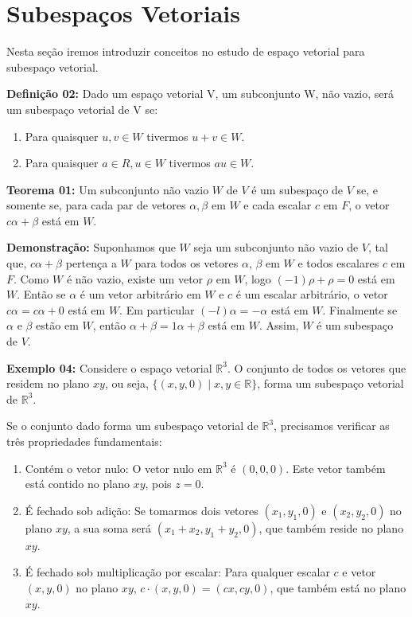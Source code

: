 \section{Subespaços Vetoriais}
Nesta seção iremos introduzir conceitos no estudo de espaço vetorial para subespaço vetorial.

\noindent\textbf{Definição 02:} Dado um espaço vetorial V, um subconjunto W, não vazio, será um subespaço vetorial de V se:
\begin{enumerate}
	\item Para quaisquer $u, v \in W$ tivermos $u + v \in W$.
	\item Para quaisquer $a \in R, u \in W$ tivermos $au \in W$.
	\end{enumerate}

\noindent\textbf{Teorema 01:} Um subconjunto não vazio $W$ de $V$ é um subespaço de $V$ se, e somente se, para cada par de vetores $\alpha, \beta$ em $W$ e cada escalar $c$ em $F$, o vetor $c\alpha + \beta$ está em $W$.

\noindent\textbf{Demonstração:} Suponhamos que $W$ seja um subconjunto não vazio de $V$, tal que, $c\alpha + \beta$ pertença a $W$ para todos os vetores $\alpha$, $\beta$ em $W$ e todos escalares $c$ em $F$. Como $W$ é não vazio, existe um vetor $\rho$ em $W$, logo $(-1) \rho + \rho = 0$ está em $W$. Então se $\alpha$ é um vetor arbitrário em $W$ e $c$ é um escalar arbitrário, o vetor $c\alpha = c\alpha + 0$ está em $W$. Em particular $(-l)\alpha = -\alpha$ está em $W$. Finalmente se $\alpha$ e $\beta$ estão em $W$, então $\alpha + \beta = 1\alpha + \beta$ está em $W$.
Assim, $W$ é um subespaço de $V$. \nocite{hoffman1979}

\noindent\textbf{Exemplo 04:} Considere o espaço vetorial $\mathbb{R}^3$. O conjunto de todos os vetores que residem no plano $xy$, ou seja, $\{(x, y, 0) \mid x, y \in \mathbb{R}\}$, forma um subespaço vetorial de $\mathbb{R}^3$.

Se o conjunto dado forma um subespaço vetorial de $\mathbb{R}^3$, precisamos verificar as três propriedades fundamentais:

\begin{enumerate}
    \item Contém o vetor nulo: O vetor nulo em $\mathbb{R}^3$ é $(0,0,0)$. Este vetor também está contido no plano $xy$, pois $z = 0$.
    
    \item É fechado sob adição: Se tomarmos dois vetores $(x_1, y_1, 0)$ e $(x_2, y_2, 0)$ no plano $xy$, a sua soma será $(x_1 + x_2, y_1 + y_2, 0)$, que também reside no plano $xy$.
    
    \item É fechado sob multiplicação por escalar: Para qualquer escalar $c$ e vetor $(x, y, 0)$ no plano $xy$, $c \cdot (x, y, 0) = (cx, cy, 0)$, que também está no plano $xy$.
\end{enumerate}

